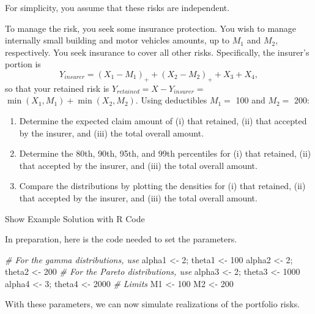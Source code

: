 \documentclass[]{book}
\newenvironment{Shaded}{\begin{snugshade}}{\end{snugshade}}
\newcommand{\DecValTok}[1]{\textcolor[rgb]{0.00,0.00,0.81}{#1}}
\newcommand{\StringTok}[1]{\textcolor[rgb]{0.31,0.60,0.02}{#1}}
\newcommand{\CommentTok}[1]{\textcolor[rgb]{0.56,0.35,0.01}{\textit{#1}}}
\newcommand{\NormalTok}[1]{#1}
\providecommand{\tightlist}{%
  \setlength{\itemsep}{0pt}\setlength{\parskip}{0pt}}
\theoremstyle{definition}
\theoremstyle{definition}
\theoremstyle{definition}
\theoremstyle{remark}
\begin{document}
For simplicity, you assume that these risks are independent.

To manage the risk, you seek some insurance protection. You wish to
manage internally small building and motor vehicles amounts, up to
\(M_1\) and \(M_2\), respectively. You seek insurance to cover all other
risks. Specifically, the insurer's portion is
\[ Y_{insurer} = (X_1 - M_1)_+ + (X_2 - M_2)_+ + X_3 + X_4 ,\] so that
your retained risk is \(Y_{retained}= X- Y_{insurer} =\)
\(\min(X_1,M_1) + \min(X_2,M_2)\). Using deductibles \(M_1=\) 100 and
\(M_2=\) 200:

\begin{enumerate}
\def\labelenumi{\alph{enumi}.}
\tightlist
\item
  Determine the expected claim amount of (i) that retained, (ii) that
  accepted by the insurer, and (iii) the total overall amount.
\item
  Determine the 80th, 90th, 95th, and 99th percentiles for (i) that
  retained, (ii) that accepted by the insurer, and (iii) the total
  overall amount.
\item
  Compare the distributions by plotting the densities for (i) that
  retained, (ii) that accepted by the insurer, and (iii) the total
  overall amount.
\end{enumerate}

Show Example Solution with R Code

\hypertarget{togglePortMgtExample}{}
In preparation, here is the code needed to set the parameters.

\begin{Shaded}
\begin{Highlighting}[]
\CommentTok{# For the gamma distributions, use}
\NormalTok{alpha1 <-}\StringTok{ }\DecValTok{2}\NormalTok{;      theta1 <-}\StringTok{ }\DecValTok{100}
\NormalTok{alpha2 <-}\StringTok{ }\DecValTok{2}\NormalTok{;      theta2 <-}\StringTok{ }\DecValTok{200}
\CommentTok{# For the Pareto distributions, use}
\NormalTok{alpha3 <-}\StringTok{ }\DecValTok{2}\NormalTok{;      theta3 <-}\StringTok{ }\DecValTok{1000}
\NormalTok{alpha4 <-}\StringTok{ }\DecValTok{3}\NormalTok{;      theta4 <-}\StringTok{ }\DecValTok{2000}
\CommentTok{# Limits}
\NormalTok{M1     <-}\StringTok{ }\DecValTok{100}
\NormalTok{M2     <-}\StringTok{ }\DecValTok{200}
\end{Highlighting}
\end{Shaded}

With these parameters, we can now simulate realizations of the portfolio
risks.
\end{document}
